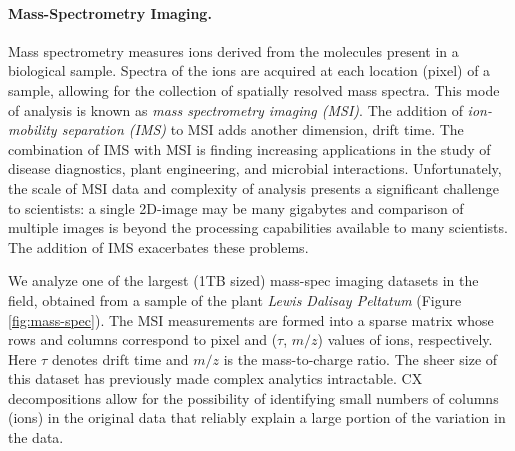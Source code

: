 \paragraph{Mass-Spectrometry Imaging.}
Mass spectrometry measures ions derived from the molecules present in a biological sample. Spectra of the ions are acquired at each location (pixel) of a sample, allowing for the collection of spatially resolved mass spectra. This mode of analysis is known as \textit{mass spectrometry imaging (MSI)}. The addition of \textit{ion-mobility separation (IMS)} to MSI adds another dimension, drift time.  The combination of IMS with MSI is finding increasing applications in the study of disease diagnostics, plant engineering, and microbial interactions. Unfortunately, the scale of MSI data and complexity of analysis presents a significant challenge to scientists: a single 2D-image may be many gigabytes and comparison of multiple images is beyond the processing capabilities available to many scientists. The addition of IMS exacerbates these problems. 

We analyze one of the largest (1TB sized) mass-spec imaging datasets in the field, obtained from a sample of the plant {\it Lewis Dalisay Peltatum} (Figure \ref{fig:mass-spec}). The MSI measurements are formed into a sparse matrix whose rows and columns correspond to pixel and ($\tau$, $m/z$) values of ions, respectively. Here $\tau$ denotes drift time and $m/z$ is the mass-to-charge ratio. The sheer size of this dataset has previously made complex analytics intractable. CX decompositions allow for the possibility of identifying small numbers of columns (ions) in the original data that reliably explain a large portion of the variation in the data.


